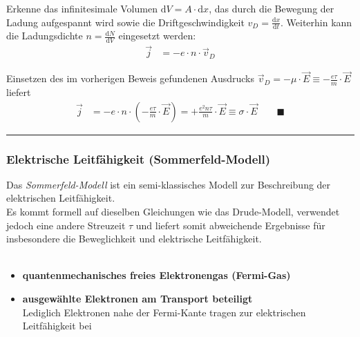 \documentclass{article}
\newcommand{\diff}{\mathrm{d}}
\newcommand{\lr}[1]{\left(#1\right)}
\begin{document}
{	Erkenne das infinitesimale Volumen $\diff V = A \cdot \diff x$, das durch die Bewegung der Ladung aufgespannt wird sowie die Driftgeschwindigkeit $v_D = \frac{\diff x}{\diff t}$. Weiterhin kann die Ladungsdichte $n = \frac{\diff N}{\diff V}$ eingesetzt werden:
		\begin{align*}
			\vec{j} &= -e \cdot n \cdot \vec{v}_D
		\end{align*}
	
	Einsetzen des im vorherigen Beweis gefundenen Ausdrucks $\vec{v}_D = -\mu \cdot \vec{E} \equiv -\frac{e\tau}{m} \cdot \vec{E}$ liefert
		\begin{align*}
			\vec{j} &= -e \cdot n \cdot \lr{ -\frac{e\tau}{m} \cdot \vec{E} } = +\frac{e^2 n \tau}{m} \cdot \vec{E} \equiv \sigma \cdot \vec{E} \qquad \blacksquare
		\end{align*}
\hrule
}


\newpage


\subsubsection{Elektrische Leitfähigkeit (Sommerfeld-Modell)}
Das \textit{Sommerfeld-Modell} ist ein semi-klassisches Modell zur Beschreibung der elektrischen Leitfähigkeit.\\
Es kommt formell auf dieselben Gleichungen wie das Drude-Modell, verwendet jedoch eine andere Streuzeit $\tau$ und liefert somit abweichende Ergebnisse für insbesondere die Beweglichkeit und elektrische Leitfähigkeit.\\
\\
	\begin{itemize}
		\item \textbf{quantenmechanisches freies Elektronengas (Fermi-Gas)}
		
		
		\item \textbf{ausgewählte Elektronen am Transport beteiligt}\\
		Lediglich Elektronen nahe der Fermi-Kante tragen zur elektrischen Leitfähigkeit bei
	\end{itemize}
\end{document}
